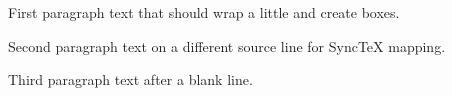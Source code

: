 \documentclass{article}
\begin{document}
First paragraph text that should wrap a little and create boxes.

Second paragraph text on a different source line for SyncTeX mapping.

Third paragraph text after a blank line.
\end{document}
